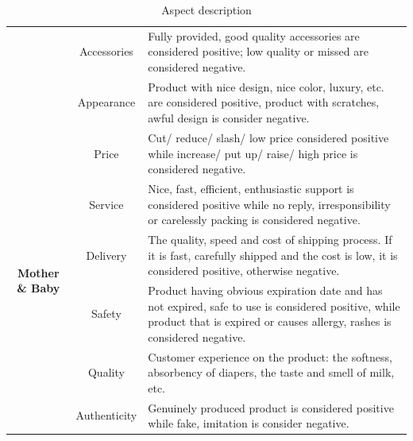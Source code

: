 \begin{table}[]
{\begin{tabular}{|c|c|>{\raggedright\arraybackslash}m{11 cm}|}
                               & Accessories              & Fully provided, good quality accessories are considered positive; low quality or missed are considered negative.                                                            \\ \cline{2-3} 
                               & Appearance               & Product with nice design, nice color, luxury, etc. are considered positive, product with scratches, awful design is consider negative.                                                                             \\ \hline
\multirow{6}{*}{\textbf{Mother \& Baby}}     & Price                    & Cut/ reduce/ slash/ low price considered positive while increase/ put up/ raise/ high price is considered negative.                                            \\ \cline{2-3} 
                               & Service                  & Nice, fast, efficient, enthusiastic support  is considered positive while no reply, irresponsibility or carelessly packing is considered negative.                                                                 \\ \cline{2-3} 
                               & Delivery               & The quality, speed and cost of shipping process. If it is fast, carefully shipped and the cost is low, it is considered positive, otherwise negative.                                                             \\ \cline{2-3} 
                               & Safety                   & Product having obvious expiration date and has not expired, safe to use is considered positive, while product that is expired or causes allergy, rashes is considered negative. \\ \cline{2-3} 
                               & Quality                  & Customer experience on the product: the softness, absorbency of diapers, the taste and smell of milk, etc.                                                                                                        \\ \cline{2-3} 
                               & Authenticity             & Genuinely produced product is considered positive while fake, imitation is consider negative.                                                                                                                      \\ \hline
\end{tabular}
}
\caption{Aspect description}
\end{table}

